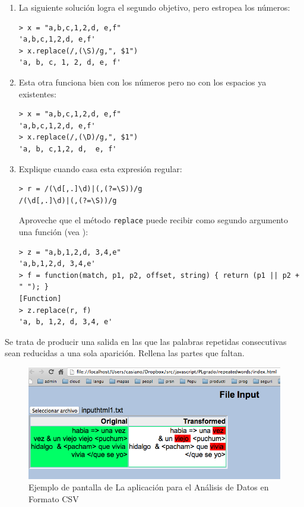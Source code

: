 \begin{enumerate}
\begin{enumerate}
\item 
La siguiente solución logra el segundo objetivo, pero estropea los números:
\begin{verbatim}
> x = "a,b,c,1,2,d, e,f"
'a,b,c,1,2,d, e,f'
> x.replace(/,(\S)/g,", $1")
'a, b, c, 1, 2, d, e, f'
\end{verbatim}
\item 
Esta  otra funciona bien con los números pero no con los espacios ya existentes:
\begin{verbatim}
> x = "a,b,c,1,2,d, e,f"
'a,b,c,1,2,d, e,f'
> x.replace(/,(\D)/g,", $1")
'a, b, c,1,2, d,  e, f'
\end{verbatim}
\item 
Explique cuando casa esta expresión regular:
\begin{verbatim}
> r = /(\d[,.]\d)|(,(?=\S))/g
/(\d[,.]\d)|(,(?=\S))/g
\end{verbatim}
Aproveche que el método \verb|replace| puede recibir como segundo argumento
una función (vea ):
\begin{verbatim}
> z = "a,b,1,2,d, 3,4,e"
'a,b,1,2,d, 3,4,e'
> f = function(match, p1, p2, offset, string) { return (p1 || p2 + " "); }
[Function]
> z.replace(r, f)
'a, b, 1,2, d, 3,4, e'
\end{verbatim}
\end{enumerate}
\end{enumerate}


Se trata de producir una salida en las que las palabras repetidas consecutivas sean reducidas a una sola aparición.
Rellena las partes que faltan.


\begin{figure}[htb]
\begin{center}
\includegraphics[scale=0.5]{chapter2/repeated_words.png}
\end{center}
\label{figure:csv}
\caption{Ejemplo de pantalla de La aplicación para el Análisis de Datos en Formato CSV}
\end{figure}

